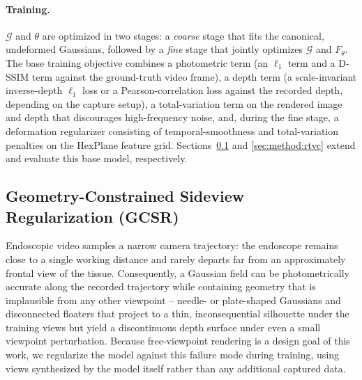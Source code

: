 \paragraph{Training.}
$\mathcal{G}$ and $\theta$ are optimized in two stages: a \emph{coarse}
stage that fits the canonical, undeformed Gaussians, followed by a
\emph{fine} stage that jointly optimizes $\mathcal{G}$ and $F_\theta$. The
base training objective combines a photometric term (an $\ell_1$ term and a
D-SSIM term against the ground-truth video frame), a depth term (a
scale-invariant inverse-depth $\ell_1$ loss or a Pearson-correlation loss
against the recorded depth, depending on the capture setup), a
total-variation term on the rendered image and depth that discourages
high-frequency noise, and, during the fine stage, a deformation regularizer
consisting of temporal-smoothness and total-variation penalties on the
HexPlane feature grid. Sections~\ref{sec:method:gcsr} and
\ref{sec:method:rtvc} extend and evaluate this base model, respectively.

\subsection{Geometry-Constrained Sideview Regularization (GCSR)}
\label{sec:method:gcsr}

Endoscopic video samples a narrow camera trajectory: the endoscope remains
close to a single working distance and rarely departs far from an
approximately frontal view of the tissue. Consequently, a Gaussian field
can be photometrically accurate along the recorded trajectory while
containing geometry that is implausible from any other viewpoint --
needle- or plate-shaped Gaussians and disconnected floaters that project to
a thin, inconsequential silhouette under the training views but yield a
discontinuous depth surface under even a small viewpoint perturbation.
Because free-viewpoint rendering is a design goal of this work, we
regularize the model against this failure mode during training, using
views synthesized by the model itself rather than any additional captured
data.

